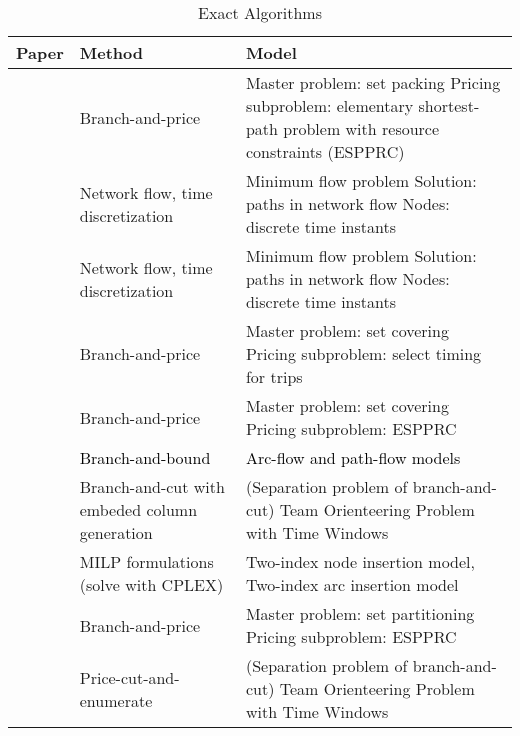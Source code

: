 \documentclass[11pt]{article}
\newcommand\addb[1]{\textcolor{black}{#1}}
\begin{document}
\begin{table}[]
\small
    \centering
    \begin{tabular}{@{}>{\raggedright}p{3.5cm}>{\raggedright}p{4cm}p{6cm}@{}}
    \toprule
         Paper  &   Method  &   Model   \\
         \midrule
         \cite{azi2010exact}
         & Branch-and-price
         & Master problem: set packing
            \newline Pricing subproblem: elementary shortest-path problem with resource constraints (ESPPRC) \\
         \midrule
         \cite{macedo2011solving}
         & Network flow, time discretization
         & Minimum flow problem
            \newline Solution: paths in network flow
            \newline Nodes: discrete time instants \\
         \midrule
         \cite{macedo2012generalized}
         & Network flow, time discretization
         & Minimum flow problem
            \newline Solution: paths in network flow
            \newline Nodes: discrete time instants \\
         \midrule
         \cite{hernandez2014new}
         & Branch-and-price
         & Master problem: set covering
            \newline Pricing subproblem: select timing for trips \\
         \midrule
         \cite{hernandez2016branch}
         & Branch-and-price
         & Master problem: set covering
            \newline Pricing subproblem: ESPPRC \\
         \midrule
         \addb{\cite{christiansen2017operational}}
         & \addb{Branch-and-bound}
         & \addb{Arc-flow and path-flow models} \\
         \midrule
         \cite{paradiso2020exact}
         & Branch-and-cut with embeded column generation
         & (Separation problem of branch-and-cut) Team Orienteering Problem with Time Windows \\
         \midrule
         \cite{neira2020new}
         & MILP formulations (solve with CPLEX)
         & Two-index node insertion model,
            \newline Two-index arc insertion model \\
         \midrule
         \cite{huang2021multi}
         & Branch-and-price
         & Master problem: set partitioning
            \newline Pricing subproblem: ESPPRC \\
         \midrule
         \cite{yang2023exact}
         & Price-cut-and-enumerate
         & (Separation problem of branch-and-cut) Team Orienteering Problem with Time Windows \\
         \bottomrule
    \end{tabular}
    \caption{Exact Algorithms}
    \label{table:2}
\end{table}
\end{document}
